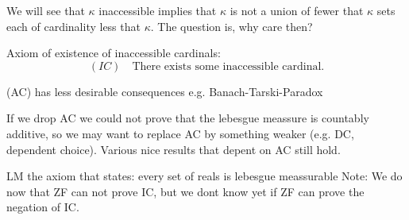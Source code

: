 We will see that 
$\kappa$ inaccessible implies that $\kappa$ is not a union of fewer that $\kappa$ sets each of cardinality less that $\kappa$.
The question is, why care then?

Axiom of existence of inaccessible cardinals:
\begin{equation}
    (IC) \quad\text{There exists some inaccessible cardinal.}
\end{equation}

(AC) has less desirable consequences e.g. Banach-Tarski-Paradox

If we drop AC we could not prove that the lebesgue meassure is countably additive,
so we may want to replace AC by something weaker (e.g. DC, dependent choice).
Various nice results that depent on AC still hold. 

LM the axiom that states: every set of reals is lebesgue meassurable
Note: We do now that ZF can not prove IC, but we dont know yet if ZF can prove the negation of IC.

